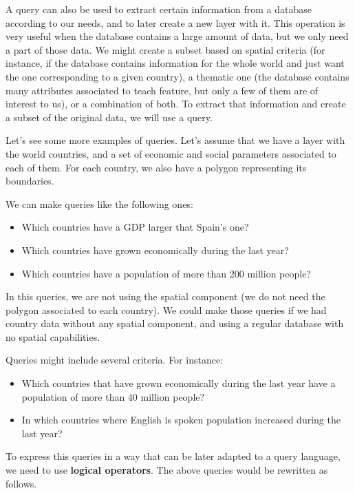A query can also be used to extract certain information from a database according to our needs, and to later create a new layer with it. This operation is very useful when the database contains a large amount of data, but we only need a part of those data. We might create a subset based on spatial criteria (for instance, if the database contains information for the whole world and just want the one corresponding to a given country), a thematic one (the database contains many attributes associated to teach feature, but only a few of them are of interest to us), or a combination of both. To extract that information and create a subset of the original data, we will use a query.

Let's see some more examples of queries. Let's assume that we have a layer with the world countries, and a set of economic and social parameters associated to each of them. For each country, we also have a polygon representing its boundaries.

We can make queries like the following ones:

\begin{itemize}
 \item Which countries have a GDP larger that Spain's one?
\item Which countries have grown economically during the last year?
\item Which countries have a population of more than 200 million people? 
\end{itemize}

In this queries, we are not using the spatial component (we do not need the polygon associated to each country). We could make those queries if we had country data without any spatial component, and using a regular database with no spatial capabilities.

Queries might include several criteria. For instance:

\begin{itemize}
 \item Which countries that have grown economically during the last year have a population of more than 40 million people?
\item In which countries where English is spoken population increased during the last year?
\end{itemize}

To express this queries in a way that can be later adapted to a query language, we need to use \textbf{logical operators}. The above queries would be rewritten as follows.

